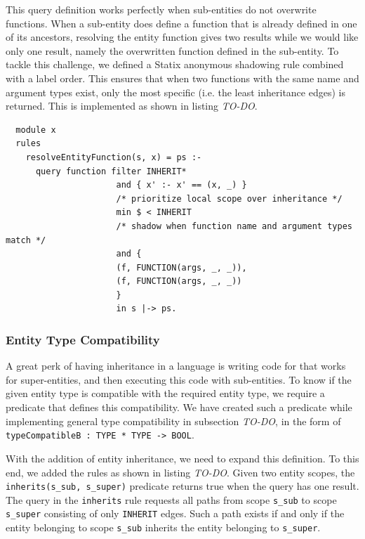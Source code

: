       This query definition works perfectly when sub-entities do not overwrite functions. When a sub-entity does define a function that is already defined in one of its ancestors, resolving the entity function gives two results while we would like only one result, namely the overwritten function defined in the sub-entity. To tackle this challenge, we defined a Statix anonymous shadowing rule combined with a label order. This ensures that when two functions with the same name and argument types exist, only the most specific (i.e. the least inheritance edges) is returned. This is implemented as shown in listing \emph{TO-DO}.

      \begin{verbatim}
  module x
  rules
    resolveEntityFunction(s, x) = ps :-
      query function filter INHERIT*
                      and { x' :- x' == (x, _) }
                      /* prioritize local scope over inheritance */
                      min $ < INHERIT
                      /* shadow when function name and argument types match */
                      and {
                      (f, FUNCTION(args, _, _)),
                      (f, FUNCTION(args, _, _))
                      }
                      in s |-> ps.
      \end{verbatim}

    \subsubsection{Entity Type Compatibility}
      A great perk of having inheritance in a language is writing code for that works for super-entities, and then executing this code with sub-entities. To know if the given entity type is compatible with the required entity type, we require a predicate that defines this compatibility. We have created such a predicate while implementing general type compatibility in subsection \emph{TO-DO}, in the form of \lstinline|typeCompatibleB : TYPE * TYPE -> BOOL|.

      With the addition of entity inheritance, we need to expand this definition. To this end, we added the rules as shown in listing \emph{TO-DO}. Given two entity scopes, the \lstinline|inherits(s_sub, s_super)| predicate returns true when the query has one result. The query in the \texttt{inherits} rule requests all paths from scope \texttt{s\_sub} to scope \texttt{s\_super} consisting of only \texttt{INHERIT} edges. Such a path exists if and only if the entity belonging to scope \texttt{s\_sub} inherits the entity belonging to \texttt{s\_super}.

